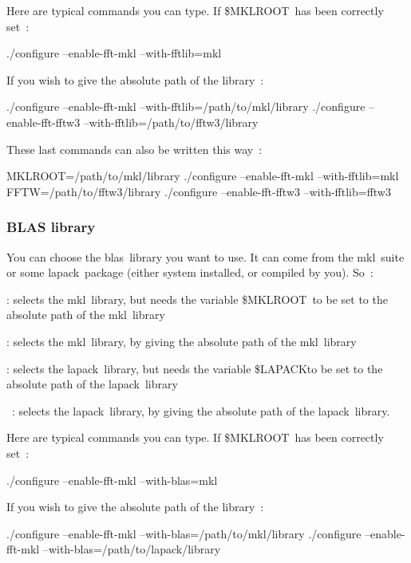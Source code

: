Here are typical commands you can type. If {\ttfamily \$\-M\-K\-L\-R\-O\-O\-T} has been correctly set \-: \begin{DoxyVerb}    ./configure --enable-fft-mkl --with-fftlib=mkl
\end{DoxyVerb}


If you wish to give the absolute path of the library \-: \begin{DoxyVerb}    ./configure --enable-fft-mkl   --with-fftlib=/path/to/mkl/library
    ./configure --enable-fft-fftw3 --with-fftlib=/path/to/fftw3/library
\end{DoxyVerb}


These last commands can also be written this way \-: \begin{DoxyVerb}    MKLROOT=/path/to/mkl/library ./configure --enable-fft-mkl   --with-fftlib=mkl
    FFTW=/path/to/fftw3/library  ./configure --enable-fft-fftw3 --with-fftlib=fftw3
\end{DoxyVerb}


\subsubsection*{B\-L\-A\-S library}

You can choose the blas library you want to use. It can come from the mkl suite or some lapack package (either system installed, or compiled by you). So \-:


\begin{DoxyItemize}
\item \-:  selects the mkl library, but needs the variable {\ttfamily \$\-M\-K\-L\-R\-O\-O\-T} to be set to the absolute path of the mkl library 
\item \-:  selects the mkl library, by giving the absolute path of the mkl library 
\item \-:  selects the lapack library, but needs the variable {\ttfamily \$\-L\-A\-P\-A\-C\-K}to be set to the absolute path of the lapack library 
\item  \-:  selects the lapack library, by giving the absolute path of the lapack library. 
\end{DoxyItemize}

Here are typical commands you can type. If {\ttfamily \$\-M\-K\-L\-R\-O\-O\-T} has been correctly set \-: \begin{DoxyVerb}    ./configure --enable-fft-mkl --with-blas=mkl
\end{DoxyVerb}


If you wish to give the absolute path of the library \-: \begin{DoxyVerb}    ./configure --enable-fft-mkl --with-blas=/path/to/mkl/library
    ./configure --enable-fft-mkl --with-blas=/path/to/lapack/library
\end{DoxyVerb}


